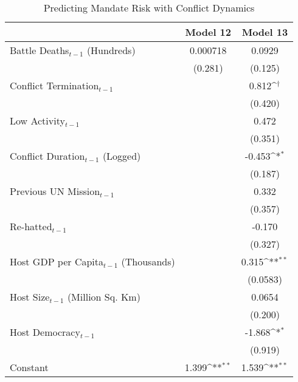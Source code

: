 \begin{table}[htbp]\centering
\fontsize{10}{10}\selectfont
\def\sym#1{\ifmmode^{#1}\else\(^{#1}\)\fi}
\caption{Predicting Mandate Risk with Conflict Dynamics\label{Fraq}}
\begin{tabular}{l*{2}{c}}
\hline\hline
                    &\multicolumn{1}{c}{Model 12}        &\multicolumn{1}{c}{Model 13}        \\
\hline
Battle Deaths$_{t-1}$ (Hundreds)&    0.000718        &      0.0929        \\
                    &     (0.281)        &     (0.125)        \\
[0.25em]
Conflict Termination$_{t-1}$&                    &       0.812\sym{\dagger} \\
                    &                    &     (0.420)        \\
[0.25em]
Low Activity$_{t-1}$        &                    &       0.472        \\
                    &                    &     (0.351)        \\
[0.25em]
Conflict Duration$_{t-1}$ (Logged)&                    &      -0.453\sym{*} \\
                    &                    &     (0.187)        \\
[0.25em]
Previous UN Mission$_{t-1}$ &                    &       0.332        \\
                    &                    &     (0.357)        \\
[0.25em]
Re-hatted$_{t-1}$           &                    &      -0.170        \\
                    &                    &     (0.327)        \\
[0.25em]
Host GDP per Capita$_{t-1}$ (Thousands)&                    &       0.315\sym{**}\\
                    &                    &    (0.0583)        \\
[0.25em]
Host Size$_{t-1}$ (Million Sq. Km)&                    &      0.0654        \\
                    &                    &     (0.200)        \\
[0.25em]
Host Democracy$_{t-1}$      &                    &      -1.868\sym{*} \\
                    &                    &     (0.919)        \\
[0.25em]
Constant            &       1.399\sym{**}&       1.539\sym{**}\\

\end{tabular}
\end{table}
